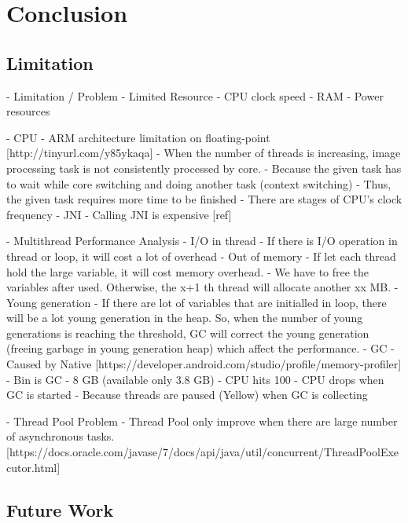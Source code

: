 \chapter{Conclusion}\label{conclusion}

    \section{Limitation}
    -	Limitation / Problem
            - Limited Resource
                - CPU clock speed
                - RAM
                - Power resources

            - CPU
                - ARM architecture limitation on floating-point [http://tinyurl.com/y85ykaqa]
                - When the number of threads is increasing, image processing task is not consistently processed by core.
                    - Because the given task has to wait while core switching and doing another task (context switching)
                    - Thus, the given task requires more time to be finished
                - There are stages of CPU's clock frequency
            - JNI
                - Calling JNI is expensive [ref]

            -	Multithread Performance Analysis
                - I/O in thread
                    - If there is I/O operation in thread or loop, it will cost a lot of overhead
                - Out of memory
                    - If let each thread hold the large variable, it will cost memory overhead.
                    - We have to free the variables after used. Otherwise, the x+1 th thread will allocate another xx MB.
                - Young generation
                    - If there are lot of variables that are initialled in loop, there will be a lot young generation in the heap. So, when the number of young generations is reaching the threshold, GC will correct the young generation (freeing garbage in young generation heap) which affect the performance.
                - GC
                    - Caused by Native [https://developer.android.com/studio/profile/memory-profiler]
                    - Bin is GC
                    - 8 GB (available only 3.8 GB)
                - CPU hits 100%
                - CPU drops when GC is started
                        - Because threads are paused (Yellow) when GC is collecting

            - Thread Pool Problem
                - Thread Pool only improve when there are large number of asynchronous tasks. [https://docs.oracle.com/javase/7/docs/api/java/util/concurrent/ThreadPoolExecutor.html]
    \section{Future Work}